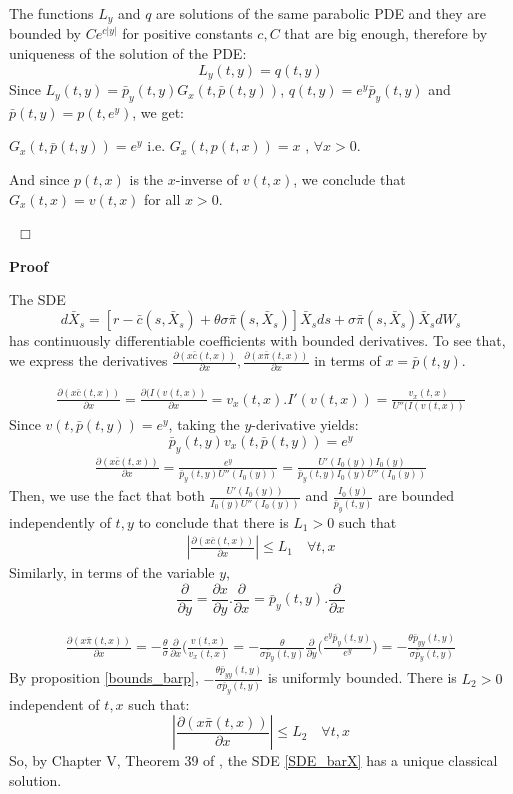 \documentclass[11pt, psfig]{article}
\theoremstyle{definition}
\theoremstyle{remark}
\numberwithin{equation}{section}
\newcommand{\be}{\begin{equation}}
\newcommand{\ee}{\end{equation}}
\def \proof{{\noindent \bf Proof}\quad}
\def \ep{\hbox{ }\hfill$\Box$}
\begin{document}
{The functions $L_y$ and $q$ are solutions of the same parabolic PDE and they are bounded by $Ce^{c|y|}$ for positive constants $c, C$ that are big enough, therefore by uniqueness of the solution of the PDE:
$$
L_y(t,y)=q(t,y)
$$
Since $L_y(t,y) = \bar{p}_y(t,y) G_x(t, \bar{p}(t,y)) $, $q(t,y)=e^y \bar{p}_y(t,y)$ and $\bar{p}(t,y)=p(t,e^y)$, we get:

$
G_x(t, \bar{p}(t,y)) = e^y 
$
i.e.
$G_x(t,p(t,x)) = x$ , $ \forall x>0$.

And since $p(t,x)$ is the $x$-inverse of $v(t,x)$, we conclude that $G_x(t,x) = v(t,x)$ for all $x>0$.

\ep

 \proof{Theorem \ref{barXbarp}}
 
 The SDE
 \be \label{SDE_barX}
 d\bar{X}_s=
 [r-\bar{c}(s,\bar{X}_s)+\theta \sigma\bar{\pi}(s,\bar{X}_s)]\bar{X}_s ds+\sigma \bar{\pi}(s,\bar{X}_s)\bar{X}_s dW_s
 \ee
  has continuously differentiable coefficients with bounded derivatives.
 To see that, we express the derivatives $\frac{\partial (x\bar{c}(t,x))}{\partial x}, \frac{\partial (x\bar{\pi}(t,x))}{\partial x}$ in terms of $x=\bar{p}(t,y)$.
 
 \begin{eqnarray*}
 \frac{\partial (x\bar{c}(t,x))}{\partial x} = \frac{\partial (I(v(t,x))}{\partial x}=v_x(t,x) . I'(v(t,x)) = \frac{v_x(t,x)}{U''(I(v(t,x))}
 \end{eqnarray*}
 Since $v(t,\bar{p}(t,y)) =e^y$, taking the $y$-derivative yields:
 \be
 \bar{p}_y(t,y) v_x(t,\bar{p}(t,y)) = e^y
 \ee
 \begin{eqnarray*}
 \frac{\partial (x\bar{c}(t,x))}{\partial x} = \frac{e^y}{\bar{p}_y(t,y) U''(I_0(y))} =  \frac{U'(I_0(y)) I_0(y)}{\bar{p}_y(t,y) I_0(y) U''(I_0(y))}
 \end{eqnarray*}
 Then, we use the fact that both $\frac{U'(I_0(y)) }{I_0(y) U''(I_0(y))}$ and $\frac{I_0(y)}{\bar{p}_y(t,y) }$ are bounded independently of $t, y$ to conclude that there is $L_1>0$ such that \begin{eqnarray*}
| \frac{\partial (x\bar{c}(t,x))}{\partial x} | \leq L_1 \quad \forall t,x
 \end{eqnarray*}
 Similarly, in terms of the variable $y$,   $$\frac{\partial }{\partial y}= \frac{\partial x}{\partial y}. \frac{\partial }{\partial x} = \bar{p}_y(t,y) . \frac{\partial }{\partial x}$$
 
 \begin{eqnarray*}
 \frac{\partial (x\bar{\pi}(t,x))}{\partial x} = -\frac{\theta}{\sigma} \frac{\partial }{\partial x}(\frac{v(t,x)}{v_x(t,x)} = -\frac{\theta}{\sigma \bar{p}_y(t,y)} \frac{\partial }{\partial y}\big(\frac{e^y\bar{p}_y(t,y)}{e^y}\big)= -\frac{\theta \bar{p}_{yy}(t,y)}{\sigma \bar{p}_y(t,y)} 
  \end{eqnarray*}
 By proposition \ref{bounds_barp}, $-\frac{\theta \bar{p}_{yy}(t,y)}{\sigma \bar{p}_y(t,y)} $ is uniformly bounded.
There is $L_2>0$ independent of $t, x$ such that: 
$$
| \frac{\partial (x\bar{\pi}(t,x))}{\partial x} | \leq L_2 \quad \forall t,x
$$
   So, by Chapter V, Theorem 39 of \cite{Pr1},
the SDE \eqref{SDE_barX} has a unique classical solution.

}
\end{document}
